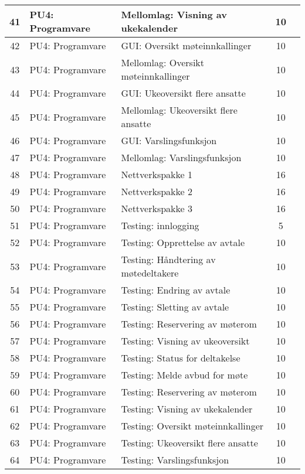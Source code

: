 \begin{table}
\begin{tabularx}{1.3\textwidth}{|c|l|X|c|c|}
	41 & PU4: Programvare & Mellomlag: Visning av ukekalender  & 10 & \\ \hline
	42 & PU4: Programvare & GUI: Oversikt møteinnkallinger & 10 & \\ \hline
	43 & PU4: Programvare & Mellomlag: Oversikt møteinnkallinger  & 10 & \\ \hline
	44 & PU4: Programvare & GUI: Ukeoversikt flere ansatte & 10 & \\ \hline
	45 & PU4: Programvare & Mellomlag: Ukeoversikt flere ansatte  & 10 & \\ \hline
	46 & PU4: Programvare & GUI: Varslingsfunksjon & 10 & \\ \hline
	47 & PU4: Programvare & Mellomlag: Varslingsfunksjon & 10 & \\ \hline
	48 & PU4: Programvare & Nettverkspakke 1 & 16 & \\ \hline
	49 & PU4: Programvare & Nettverkspakke 2 & 16 & \\ \hline
	50 & PU4: Programvare & Nettverkspakke 3 & 16 & \\ \hline
	51 & PU4: Programvare & Testing: innlogging & 5 & \\ \hline
	52 & PU4: Programvare & Testing: Opprettelse av avtale & 10 & \\ \hline
	53 & PU4: Programvare & Testing: Håndtering av møtedeltakere & 10 & \\ \hline
	54 & PU4: Programvare & Testing: Endring av avtale & 10 & \\  \hline
	55 & PU4: Programvare & Testing: Sletting av avtale & 10 & \\ \hline
	56 & PU4: Programvare & Testing: Reservering av møterom & 10 & \\ \hline
	57 & PU4: Programvare & Testing: Visning av ukeoversikt & 10 & \\ \hline
	58 & PU4: Programvare & Testing: Status for deltakelse & 10 & \\ \hline
	59 & PU4: Programvare & Testing: Melde avbud for møte & 10 & \\ \hline
	60 & PU4: Programvare & Testing: Reservering av møterom & 10 & \\ \hline
	61 & PU4: Programvare & Testing: Visning av ukekalender & 10 & \\ \hline
	62 & PU4: Programvare & Testing: Oversikt møteinnkallinger & 10 & \\ \hline
	63 & PU4: Programvare & Testing: Ukeoversikt flere ansatte & 10 & \\ \hline
	64 & PU4: Programvare & Testing: Varslingsfunksjon & 10 & \\ \hline

\end{tabularx}
\end{table}
